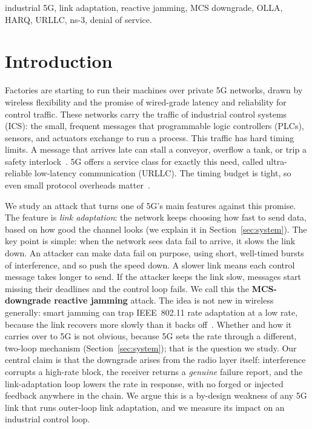 \documentclass[conference]{IEEEtran}
\begin{document}
\begin{IEEEkeywords}
industrial 5G, link adaptation, reactive jamming, MCS downgrade, OLLA, HARQ, URLLC,
ns-3, denial of service.
\end{IEEEkeywords}

\section{Introduction}
Factories are starting to run their machines over private 5G networks, drawn by wireless
flexibility and the promise of wired-grade latency and reliability for control traffic.
These networks carry the traffic of industrial control systems (ICS): the small, frequent
messages
that programmable logic controllers (PLCs), sensors, and actuators exchange to run a
process. This traffic has hard timing limits. A message that arrives late can stall a
conveyor, overflow a tank, or trip a safety interlock~\cite{lenz2026security,
michaelides2025secure}. 5G offers a service class for exactly this need, called
ultra-reliable low-latency communication (URLLC). The timing budget is tight, so even
small protocol overheads matter~\cite{michaelides2026latency}.

We study an attack that turns one of 5G's main features against this promise. The
feature is \emph{link adaptation}: the network keeps choosing how fast to send data,
based on how good the channel looks (we explain it in Section~\ref{sec:system}). The key
point is simple: when the network sees data fail to arrive, it slows the link down. An
attacker can make data fail on purpose, using short, well-timed bursts of interference,
and so push the speed down. A slower link means each control message takes longer to
send. If the attacker keeps the link slow, messages start missing their deadlines and
the control loop fails. We call this the \textbf{MCS-downgrade reactive jamming}
attack. The idea is not new in wireless generally: smart jamming can trap IEEE~802.11
rate adaptation at a low rate, because the link recovers more slowly than it backs
off~\cite{thapa2011rate}. Whether and how it carries over to 5G is not obvious, because
5G sets the rate through a different, two-loop mechanism (Section~\ref{sec:system}); that
is the question we study. Our central claim is that the downgrade arises from the radio
layer itself: interference corrupts a high-rate block, the receiver returns a
\emph{genuine} failure report, and the link-adaptation loop lowers the rate in response,
with no forged or injected feedback anywhere in the chain. We argue
this is a by-design weakness of any 5G link that runs outer-loop link adaptation, and we
measure its impact on an industrial control loop.
\end{document}

